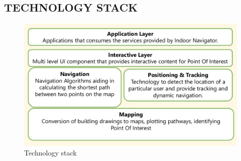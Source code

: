 ﻿\documentclass[a4paper, 12pt]{article}
\begin{document}
\subsection{TECHNOLOGY STACK}
\begin{figure}[h!]
    \centering
    \includegraphics[width = 6in]{1.png}
    \caption{Technology stack}
    \label{fig: blockbit}
\end{figure}
\end{document}
